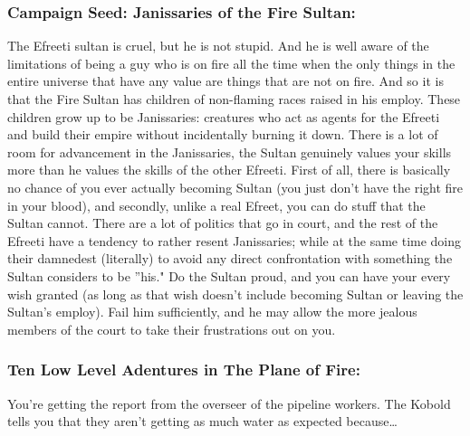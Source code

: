 \subsubsection{Campaign Seed: Janissaries of the Fire Sultan:} The Efreeti sultan is cruel, but he is not stupid. And he is well aware of the limitations of being a guy who is on fire all the time when the only things in the entire universe that have any value are things that are not on fire. And so it is that the Fire Sultan has children of non-flaming races raised in his employ. These children grow up to be Janissaries: creatures who act as agents for the Efreeti and build their empire without incidentally burning it down. There is a lot of room for advancement in the Janissaries, the Sultan genuinely values your skills more than he values the skills of the other Efreeti. First of all, there is basically no chance of you ever actually becoming Sultan (you just don't have the right fire in your blood), and secondly, unlike a real Efreet, you can do stuff that the Sultan cannot. There are a lot of politics that go in court, and the rest of the Efreeti have a tendency to rather resent Janissaries; while at the same time doing their damnedest (literally) to avoid any direct confrontation with something the Sultan considers to be ''his." Do the Sultan proud, and you can have your every wish granted (as long as that wish doesn't include becoming Sultan or leaving the Sultan's employ). Fail him sufficiently, and he may allow the more jealous members of the court to take their frustrations out on you.

\subsubsection{Ten Low Level Adentures in The Plane of Fire:}

You're getting the report from the overseer of the pipeline workers. The Kobold tells you that they aren't getting as much water as expected because\ldots

